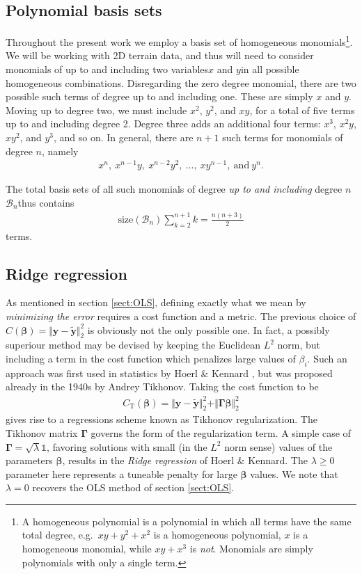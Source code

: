 \documentclass[a4paper]{article}
\begin{document}
\begin{multicols}{2}
\subsection{Polynomial basis sets}
Throughout the present work we employ a basis set of homogeneous monomials\footnote{A homogeneous polynomial is a polynomial in which all terms have the same total degree, e.g.\ $xy+y^2+x^2$ is a homogeneous polynomial, $x$ is a homogeneous monomial, while $xy+x^3$ is \textit{not}. Monomials are simply polynomials with only a single term.}. We will be working with 2D terrain data, and thus will need to consider monomials of up to and including two variables\textemdash $x$ and $y$\textemdash in all possible homogeneous combinations. Disregarding the zero degree monomial, there are two possible such terms of degree up to and including one. These are simply $x$ and $y$. Moving up to degree two, we must include $x^2$, $y^2$, and $xy$, for a total of five terms up to and including degree 2. Degree three adds an additional four terms: $x^3$, $x^2y$, $xy^2$, and $y^3$, and so on. In general, there are $n+1$ such terms for monomials of degree $n$, namely 
\begin{align}
x^n,\ x^{n-1}y, \ x^{n-2}y^2, \ \dots, \ xy^{n-1}, \ \text{and} \ y^n. \nonumber
\end{align}

The total basis sets of all such monomials of degree \textit{up to and including} degree $n$\textemdash $\mathcal{B}_n$\textemdash thus contains 
\begin{align}
\text{size}(\mathcal{B}_n) \sum_{k=2}^{n+1}k = \frac{n(n+3)}{2}
\end{align}
terms. 
\subsection{Ridge regression \label{sect:ridge}}
As mentioned in section \ref{sect:OLS}, defining exactly what we mean by \textit{minimizing the error} requires a cost function and a metric. The previous choice of $C(\bm\beta)=\Vert \mathbf{y}-\tilde{\mathbf{y}}\Vert_2^2$ is obviously not the only possible one. In fact, a possibly superiour method may be devised by keeping the Euclidean $L^2$ norm, but including a term in the cost function which penalizes large values of $\beta_i$. Such an approach was first used in statistics by Hoerl \& Kennard \autocite{hoerl1970ridge}, but was proposed already in the 1940s by Andrey Tikhonov\autocite{tikhonov1943stability}. Taking the cost function to be 
\begin{align}
C_\text{T}(\bm\beta) = \Vert \mathbf{y}-\tilde{\mathbf{y}}\Vert_2^2 + \Vert \bm\Gamma \bm\beta \Vert_2^2
\end{align}
gives rise to a regressions scheme known as Tikhonov regularization. The Tikhonov matrix $\bm\Gamma$ governs the form of the regularization term. A simple case of $\bm\Gamma=\sqrt{\lambda} \mathds{1}$, favoring solutions with small (in the $L^2$ norm sense) values of the parameters $\bm\beta$, results in the \textit{Ridge regression} of Hoerl \& Kennard. The $\lambda\ge 0$ parameter here represents a tuneable penalty for large $\bm\beta$ values. We note that $\lambda=0$ recovers the OLS method of section \ref{sect:OLS}.


\end{multicols}
\end{document}
